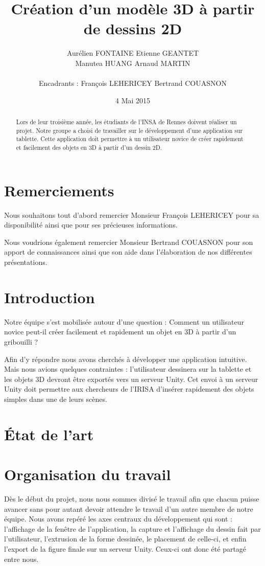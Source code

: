 \documentclass[a4paper,11pt]{article}
\title{ \textbf{Création d'un modèle 3D à partir de dessins 2D} }
\author{ Aurélien \textsc{FONTAINE} Etienne \textsc{GEANTET} \\
	Manutea \textsc{HUANG} Arnaud \textsc{MARTIN} \\
	\\
	Encadrants : François \textsc{LEHERICEY}	Bertrand \textsc{COUASNON}}
\date{4 Mai 2015}                    %
\begin{document}
\maketitle                 %
\thispagestyle{empty}      %

\begin{abstract}
	Lors de leur troisième année, les étudiants de l'INSA de Rennes doivent réaliser un projet. Notre groupe a choisi de travailler sur le développement d'une application sur tablette. Cette application doit permettre à un utilisateur novice de créer rapidement et facilement des objets en 3D à partir d'un dessin 2D. 
\end{abstract}
	
	\section{Remerciements}
		Nous souhaitons tout d'abord remercier Monsieur François LEHERICEY pour sa disponibilité ainsi que pour ses précieuses informations.
		
		Nous voudrions également remercier Monsieur Bertrand COUASNON pour son apport de connaissances ainsi que son aide dans l'élaboration de nos différentes présentations.
				
	\section{Introduction} %
		Notre équipe s'est mobilisée autour d'une question : Comment un utilisateur novice peut-il créer facilement et rapidement un objet en 3D à partir d'un gribouilli ?
		
		Afin d'y répondre nous avons cherchés à développer une application intuitive. Mais nous avions quelques contraintes : l'utilisateur dessinera sur la tablette et les objets 3D devront être exportés vers un serveur Unity. Cet envoi à un serveur Unity doit permettre aux chercheurs de l'IRISA d'insérer rapidement des objets simples dans une de leurs scènes.
	\section{État de l'art}
	\section{Organisation du travail}
	Dès le début du projet, nous nous sommes divisé le travail afin que chacun puisse avancer sans pour autant devoir attendre le travail d'un autre membre de notre équipe. Nous avons repéré les axes centraux du développement qui sont : l'affichage de la fenêtre de l'application, la capture et l'affichage du dessin fait par l'utilisateur, l'extrusion de la forme dessinée, le placement de celle-ci, et enfin l'export de la figure finale sur un serveur Unity. Ceux-ci ont donc été partagé entre nous.
	
\end{document}
